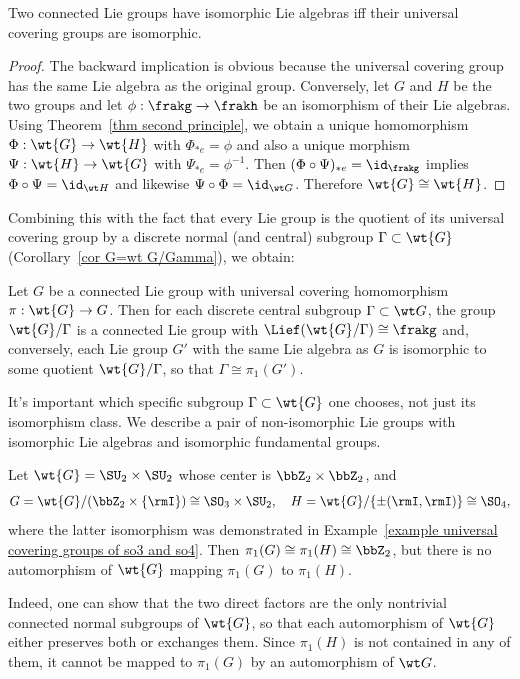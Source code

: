 \begin{thm}[{{\cite[Thm.~9.5.13]{HN}}}]
    Two connected Lie groups have isomorphic Lie algebras iff their universal covering groups are isomorphic.
\end{thm}
\begin{proof}
    The backward implication is obvious because the universal covering group has the same Lie algebra as the original group. Conversely, let $G$ and $H$ be the two groups and let $\phi:\frakg\to \frakh$ be an isomorphism of their Lie algebras. Using Theorem~\ref{thm second principle}, we obtain a unique homomorphism $\Phi:\wt{G}\to \wt{H}$ with $\Phi_{\ast e}=\phi$ and also a unique morphism $\Psi:\wt{H}\to \wt{G}$ with $\Psi_{\ast e}=\phi^{-1}$. Then $(\Phi\circ\Psi)_{\ast e}=\id_{\frakg}$ implies  $\Phi\circ\Psi=\id_{\wt H}$ and likewise $\Psi\circ\Phi=\id_{\wt G}$. Therefore $\wt{G}\cong \wt{H}$.
\end{proof}
Combining this with the fact that every Lie group is the quotient of its universal covering group by a discrete normal (and central) subgroup $\Gamma\subset \wt{G}$ (Corollary~\ref{cor G=wt G/Gamma}), we obtain:

\begin{cor}
    Let $G$ be a connected Lie group with universal covering homomorphism $\pi:\wt{G}\to G$. Then for each discrete central subgroup $\Gamma\subset \wt G$, the group $\wt{G}\slash\Gamma$ is a connected Lie group with $\Lief (\wt{G}\slash \Gamma)\cong \frakg$  and, conversely, each Lie group $G'$ with the same Lie algebra as $G$ is isomorphic to some quotient $\wt{G}\slash \Gamma$, so that $\Gamma\cong \pi_1(G')$.
\end{cor}

\begin{example}
    It's important which specific subgroup $\Gamma\subset \wt{G}$ one chooses, not just its isomorphism class.
    We describe a pair of non-isomorphic Lie groups with isomorphic Lie algebras and isomorphic fundamental groups.

    Let $\wt{G}=\SU_2\times \SU_2$ whose center is $\bbZ_2\times\bbZ_2$, and 
    \[G=\wt{G}\slash (\bbZ_2\times \{\rmI\})\cong \SO_3\times \SU_2,\quad H=\wt{G}\slash \{\pm (\rmI,\rmI)\}\cong \SO_4,\]
    where the latter isomorphism was demonstrated in Example~\ref{example universal covering groups of so3 and so4}. Then $\pi_1(G)\cong \pi_1(H)\cong \bbZ_2$, but there is no automorphism of $\wt{G}$ mapping $\pi_1(G)$ to $\pi_1(H)$.

    Indeed, one can show that the two direct factors are the only nontrivial connected normal subgroups of $\wt{G}$, so that each automorphism of $\wt{G}$ either preserves both or exchanges them. Since $\pi_1(H)$ is not contained in any of them, it cannot be mapped to $\pi_1(G)$ by an automorphism of $\wt G$.
\end{example}

